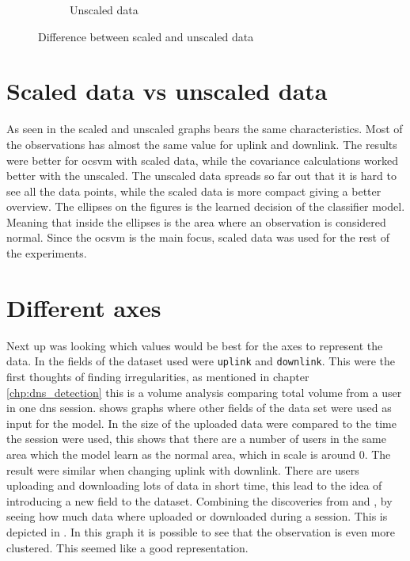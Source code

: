 \begin{figure}[hbp]
\begin{subfigure}[b]{0.4\textwidth}
		\caption{Unscaled data}
		\label{fig:unscaledUpDown}
	\end{subfigure}
\caption{Difference between scaled and unscaled data}
\label{fig:scaledVSUnscaledUpDown}
\end{figure}


\section{Scaled data vs unscaled data}
As seen in  the scaled and unscaled graphs bears the same characteristics. Most of the observations has almost the same value for uplink and downlink. 
The results were better for \gls{ocsvm} with scaled data, while the covariance calculations worked better with the unscaled. The unscaled data spreads so far out that it is hard to see all the data points, while the scaled data is more compact giving a better overview. The ellipses on the figures is the learned decision of the classifier model. Meaning that inside the ellipses is the area where an observation is considered normal. Since the \gls{ocsvm} is the main focus, scaled data was used for the rest of the experiments.

\section{Different axes}
Next up was looking which values would be best for the axes to represent the data. In  the fields of the dataset used were \texttt{uplink} and \texttt{downlink}. This were the first thoughts of finding irregularities, as mentioned in chapter \ref{chp:dns_detection} this is a volume analysis comparing total volume from a user in one \gls{dns} session.  shows graphs where other fields of the data set were used as input for the model. In  the size of the uploaded data were compared to the time the session were used, this shows that there are a number of users in the same area which the model learn as the normal area, which in scale is around 0. The result were similar when changing uplink with downlink. There are users uploading and downloading lots of data in short time, this lead to the idea of introducing a new field to the dataset. Combining the discoveries from  and , by seeing how much data where uploaded or downloaded during a session. This is depicted in . In this graph it is possible to see that the observation is even more clustered. This seemed like a good representation. 


